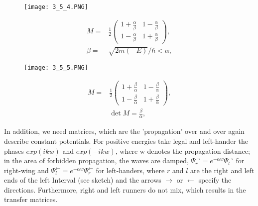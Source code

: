 \begin{figure}[ht]
    \begin{minipage}{0.5\textwidth}
        \centering
        \texttt{[image: 3\_5\_4.PNG]}
    \end{minipage}
    \begin{minipage}{0.5\textwidth}
        \begin{equation}
            \begin{aligned}
                M = &\frac{1}{2}\left(\begin{array}{cc}{1+\frac{\alpha}{\beta}} & {1-\frac{\alpha}{\beta}}\\{1-\frac{\alpha}{\beta}}&{1+\frac{\alpha}{\beta}}
                \end{array}\right),
                \\\beta =& \sqrt{2m(-E)}/\hbar<\alpha,
            \end{aligned}
        \end{equation}
    \end{minipage}
\end{figure}
\begin{figure}[ht]
    \begin{minipage}{0.5\textwidth}
        \centering
        \texttt{[image: 3\_5\_5.PNG]}
    \end{minipage}
    \begin{minipage}{0.5\textwidth}
        \begin{equation}
            \begin{aligned}
                M = &\frac{1}{2}\left(\begin{array}{cc}{1+\frac{\beta}{\alpha}} & {1-\frac{\beta}{\alpha}}\\{1-\frac{\beta}{\alpha}}&{1+\frac{\beta}{\alpha}}
                \end{array}\right),
                \\& \operatorname{det}M=\frac{\beta}{\alpha},
            \end{aligned}
        \end{equation}
    \end{minipage}
\end{figure}
In addition, we need matrices, which are the 'propagation' over and over again describe constant potentials. For positive energies take legal and left-hander the phases $exp (ikw)$ and $exp (-ikw)$, where w denotes the propagation distance; in the area of ​​forbidden propagation, the waves are damped, $\Psi^{\to}_r = e^{-αw}Ψ^{\to}_l$ for right-wing and $\Psi^{\leftarrow}_l = e^{-αw}Ψ^{\gets}_r$ for left-handers, where $r$ and $l$ are the right and left ends of the left Interval (see sketch) and the arrows $\to$ or $\gets$ specify the directions. Furthermore, right and left runners do not mix, which results in the transfer matrices.\\

